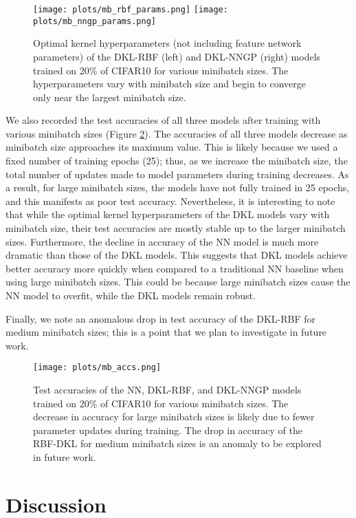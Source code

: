 \documentclass{article}
\begin{document}
\begin{figure}
\centering
\texttt{[image: plots/mb\_rbf\_params.png]}%
\texttt{[image: plots/mb\_nngp\_params.png]}
\caption{\label{fig-mb-params} Optimal kernel hyperparameters (not including feature network parameters) of the DKL-RBF (left) and DKL-NNGP (right) models trained on 20\% of CIFAR10 for various minibatch sizes. The hyperparameters vary with minibatch size and begin to converge only near the largest minibatch size.}
\end{figure}

We also recorded the test accuracies of all three models after training with various minibatch sizes (Figure \ref{fig-mb-accs}). The accuracies of all three models decrease as minibatch size approaches its maximum value. This is likely because we used a fixed number of training epochs (25); thus, as we increase the minibatch size, the total number of updates made to model parameters during training decreases. As a result, for large minibatch sizes, the models have not fully trained in 25 epochs, and this manifests as poor test accuracy. Nevertheless, it is interesting to note that while the optimal kernel hyperparameters of the DKL models vary with minibatch size, their test accuracies are mostly stable up to the larger minibatch sizes. Furthermore, the decline in accuracy of the NN model is much more dramatic than those of the DKL models. This suggests that DKL models achieve better accuracy more quickly when compared to a traditional NN baseline when using large minibatch sizes. This could be because large minibatch sizes cause the NN model to overfit, while the DKL models remain robust.

Finally, we note an anomalous drop in test accuracy of the DKL-RBF for medium minibatch sizes; this is a point that we plan to investigate in future work.

\begin{figure}
\centering
\texttt{[image: plots/mb\_accs.png]}
\caption{\label{fig-mb-accs} Test accuracies of the NN, DKL-RBF, and DKL-NNGP models trained on 20\% of CIFAR10 for various minibatch sizes. The decrease in accuracy for large minibatch sizes is likely due to fewer parameter updates during training. The drop in accuracy of the RBF-DKL for medium minibatch sizes is an anomaly to be explored in future work.}
\end{figure}

\section{Discussion}
\end{document}
